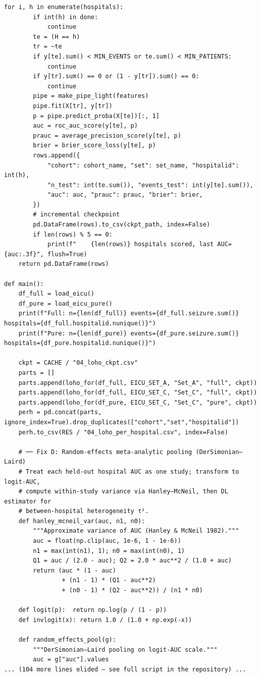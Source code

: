 \documentclass[11pt,a4paper]{article}
\begin{document}
\begin{lstlisting}[style=codeblock]
    for i, h in enumerate(hospitals):
        if int(h) in done:
            continue
        te = (H == h)
        tr = ~te
        if y[te].sum() < MIN_EVENTS or te.sum() < MIN_PATIENTS:
            continue
        if y[tr].sum() == 0 or (1 - y[tr]).sum() == 0:
            continue
        pipe = make_pipe_light(features)
        pipe.fit(X[tr], y[tr])
        p = pipe.predict_proba(X[te])[:, 1]
        auc = roc_auc_score(y[te], p)
        prauc = average_precision_score(y[te], p)
        brier = brier_score_loss(y[te], p)
        rows.append({
            "cohort": cohort_name, "set": set_name, "hospitalid": int(h),
            "n_test": int(te.sum()), "events_test": int(y[te].sum()),
            "auc": auc, "prauc": prauc, "brier": brier,
        })
        # incremental checkpoint
        pd.DataFrame(rows).to_csv(ckpt_path, index=False)
        if len(rows) % 5 == 0:
            print(f"    {len(rows)} hospitals scored, last AUC={auc:.3f}", flush=True)
    return pd.DataFrame(rows)

def main():
    df_full = load_eicu()
    df_pure = load_eicu_pure()
    print(f"Full: n={len(df_full)} events={df_full.seizure.sum()} hospitals={df_full.hospitalid.nunique()}")
    print(f"Pure: n={len(df_pure)} events={df_pure.seizure.sum()} hospitals={df_pure.hospitalid.nunique()}")

    ckpt = CACHE / "04_loho_ckpt.csv"
    parts = []
    parts.append(loho_for(df_full, EICU_SET_A, "Set_A", "full", ckpt))
    parts.append(loho_for(df_full, EICU_SET_C, "Set_C", "full", ckpt))
    parts.append(loho_for(df_pure, EICU_SET_C, "Set_C", "pure", ckpt))
    perh = pd.concat(parts, ignore_index=True).drop_duplicates(["cohort","set","hospitalid"])
    perh.to_csv(RES / "04_loho_per_hospital.csv", index=False)

    # ── Fix D: Random-effects meta-analytic pooling (DerSimonian–Laird)
    # Treat each held-out hospital AUC as one study; transform to logit-AUC,
    # compute within-study variance via Hanley–McNeil, then DL estimator for
    # between-hospital heterogeneity τ².
    def hanley_mcneil_var(auc, n1, n0):
        """Approximate variance of AUC (Hanley & McNeil 1982)."""
        auc = float(np.clip(auc, 1e-6, 1 - 1e-6))
        n1 = max(int(n1), 1); n0 = max(int(n0), 1)
        Q1 = auc / (2.0 - auc); Q2 = 2.0 * auc**2 / (1.0 + auc)
        return (auc * (1 - auc)
                + (n1 - 1) * (Q1 - auc**2)
                + (n0 - 1) * (Q2 - auc**2)) / (n1 * n0)

    def logit(p):  return np.log(p / (1 - p))
    def invlogit(x): return 1.0 / (1.0 + np.exp(-x))

    def random_effects_pool(g):
        """DerSimonian–Laird pooling on logit-AUC scale."""
        auc = g["auc"].values
... (104 more lines elided — see full script in the repository) ...
\end{lstlisting}
\end{document}
